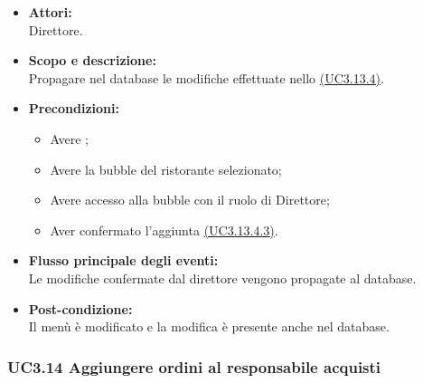 \begin{itemize}
	\item \textbf{Attori:}
	\\Direttore.
	\item \textbf{Scopo e descrizione:} 
	\\Propagare nel database le modifiche effettuate nello \hyperref[UC3.13.4]{(UC3.13.4)}.
	\item \textbf{Precondizioni:}
	\begin{itemize}
		\item Avere ;
		\item Avere la bubble del ristorante selezionato;
		\item Avere accesso alla bubble con il ruolo di Direttore;
		\item Aver confermato l’aggiunta \hyperref[UC3.13.4.3]{(UC3.13.4.3)}.
	\end{itemize}
	\item \textbf{Flusso principale degli eventi:}
	\\Le modifiche confermate dal direttore vengono propagate al database.
	\item \textbf{Post-condizione:}
	\\Il menù è modificato e la modifica è presente anche nel database.
\end{itemize}

\subsubsection{UC3.14 Aggiungere ordini al responsabile acquisti} \label{UC3.14}

